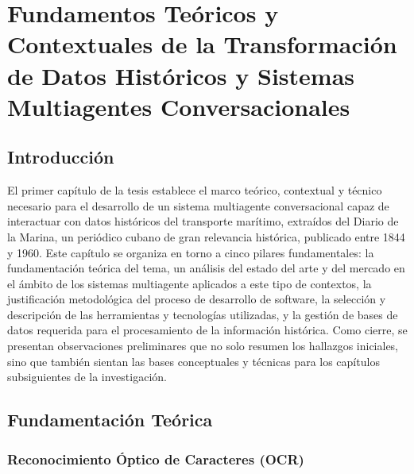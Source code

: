 \chapter{Fundamentos Teóricos y Contextuales de la Transformación de Datos Históricos y Sistemas Multiagentes Conversacionales}
\label{chap:chapter1}

\section*{Introducción}

El primer capítulo de la tesis establece el marco teórico, contextual y técnico necesario para el desarrollo de un sistema multiagente conversacional capaz de interactuar con datos históricos del transporte marítimo, extraídos del Diario de la Marina, un periódico cubano de gran relevancia histórica, publicado entre 1844 y 1960. Este capítulo se organiza en torno a cinco pilares fundamentales: la fundamentación teórica del tema, un análisis del estado del arte y del mercado en el ámbito de los sistemas multiagente aplicados a este tipo de contextos, la justificación metodológica del proceso de desarrollo de software, la selección y descripción de las herramientas y tecnologías utilizadas, y la gestión de bases de datos requerida para el procesamiento de la información histórica. Como cierre, se presentan observaciones preliminares que no solo resumen los hallazgos iniciales, sino que también sientan las bases conceptuales y técnicas para los capítulos subsiguientes de la investigación.

\section{Fundamentación Teórica}\label{seq_0}

\subsection{Reconocimiento Óptico de Caracteres (OCR)}\label{seq_1}

